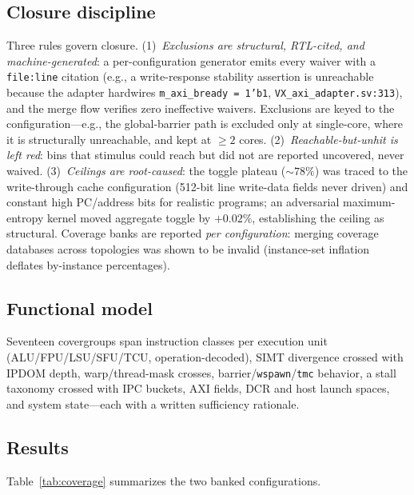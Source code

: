 \documentclass[conference]{IEEEtran}
\newcommand{\code}[1]{\texttt{\small #1}}
\begin{document}
\subsection{Closure discipline}
Three rules govern closure. (1)~\emph{Exclusions are structural,
RTL-cited, and machine-generated}: a per-configuration generator emits
every waiver with a \code{file:line} citation (e.g., a write-response
stability assertion is unreachable because the adapter hardwires
\code{m\_axi\_bready = 1'b1}, \code{VX\_axi\_adapter.sv:313}), and the
merge flow verifies zero ineffective waivers. Exclusions are keyed to
the configuration---e.g., the global-barrier path is excluded only at
single-core, where it is structurally unreachable, and kept at
$\geq 2$ cores. (2)~\emph{Reachable-but-unhit is left red}: bins that
stimulus could reach but did not are reported uncovered, never waived.
(3)~\emph{Ceilings are root-caused}: the toggle plateau
(${\sim}78\%$) was traced to the write-through cache configuration
(512-bit line write-data fields never driven) and constant high
PC/address bits for realistic programs; an adversarial maximum-entropy
kernel moved aggregate toggle by $+0.02\%$, establishing the ceiling as
structural. Coverage banks are reported \emph{per configuration}:
merging coverage databases across topologies was shown to be invalid (instance-set
inflation deflates by-instance percentages).

\subsection{Functional model}
Seventeen covergroups span instruction classes per execution unit
(ALU/FPU/LSU/SFU/TCU, operation-decoded), SIMT divergence crossed with
IPDOM depth, warp/thread-mask crosses, barrier/\code{wspawn}/\code{tmc}
behavior, a stall taxonomy crossed with IPC buckets, AXI fields, DCR
and host launch spaces, and system state---each with a written
sufficiency rationale.

\subsection{Results}
Table~\ref{tab:coverage} summarizes the two banked configurations.
\end{document}
